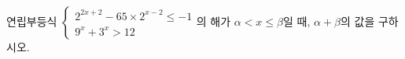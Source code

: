 연립부등식 $\begin{cases} 2^{2x+2}-65\times 2^{x-2}\le -1 \\ 9^x+3^x>12 \end{cases}$의 해가 $\alpha<x\le\beta$일 때, $\alpha+\beta$의 값을 구하시오.

